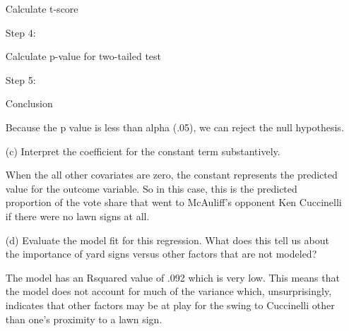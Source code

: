 \documentclass[12pt,letterpaper]{article}
\begin{document}
\begin{enumerate}
	Calculate t-score 
	
	
		\newpage
	Step 4:
	
	Calculate p-value for two-tailed test
	
	
	\vspace{.5cm}
	Step 5: 
	
	Conclusion
	
	Because the p value is less than alpha (.05), we can reject
	the null hypothesis.
	\vspace{1cm}
	
	\item [(c)] Interpret the coefficient for the constant term substantively.
	\vspace{.5cm}
	
	When the all other covariates are zero, the constant 
	represents the predicted value for the outcome 
	 variable. So in this case, this is the predicted proportion
	of the vote share that went to McAuliff's opponent
	Ken Cuccinelli if there were no lawn signs at all.
	\vspace{1cm}
	
	\item [(d)] Evaluate the model fit for this regression.  What does this	tell us about the importance of yard signs versus other factors that are not modeled?
	\vspace{.5cm}
	
	The model has an Rsquared value of .092 which is very low.
	This means that the model does not account for much 
	of the variance which, unsurprisingly, indicates that other factors may be
	 at play for the swing to Cuccinelli other than one's proximity
	to a lawn sign.
	
	
\end{enumerate}  
\end{document}
